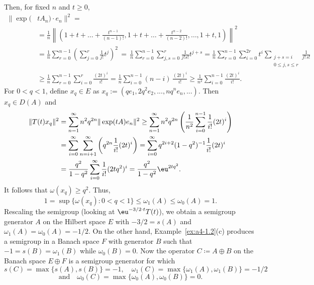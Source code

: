 \begin{example}
Then, for fixed $n$ and $t\ge 0$, 
\begin{align*}
	\|\exp(&t A_n) \cdot e_n\|^2 = \\
	&= \frac{1}{n} \left\| (1 + t + \dots + \frac{t^{n-1}}{(n-1)!}, 1 + t + \dots + \frac{t^{n-2}}{(n-2)!}, \dots, 1+t, 1) \right\|^2 \\
	&=
	\frac{1}{n} \sum_{r=0}^{n-1} \left(\sum_{j=0}^{r} \frac{1}{j!} t^j \right)^2 
	\, = \, \frac{1}{n} \sum_{r=0}^{n-1} \sum_{j,s=0}^{r} \frac{1}{j!s!} t^{j+s} 
	= \frac{1}{n} \sum_{r=0}^{n-1} \sum_{i=0}^{2r} t^i
	\sum_{\substack{j+s=i\\0\le j,s\le r}} \frac{1}{j!\,s!} \\
	&\ge \frac{1}{n} \sum_{r=0}^{n-1} \sum_{i=0}^{r} \frac{(2t)^i}{i!} 
	= \frac{1}{n} \sum_{i=0}^{n-1} (n-i)\,\frac{(2t)^i}{i!} 
	\ge \frac{1}{n^2} \sum_{i=0}^{n-1} \frac{(2t)^i}{i!}.
\end{align*}
For $ 0 < q < 1 $, define $ x_q \in E $ as  
$
x_q :=  (q e_1, 2q^2 e_2, ..., n q^n e_n, ...).
$
Then $x_q \in D(A)$ and
\begin{align*}
	\|T(t)x_q\|^2 & = \sum_{n=1}^{\infty} n^2 q^{2n} \| \exp(t A) e_n \|^2
	\geq \sum_{n=1}^{\infty} n^2 q^{2n} \left(\frac{1}{n^2} \sum_{i=0}^{n-1}  \frac{1}{i!} (2t)^i \right)\\
	&= \sum_{i=0}^{\infty} \sum_{n=i+1}^{\infty} \left( q^{2n} \frac{1}{i!} (2t)^i \right)
	= \sum_{i=0}^{\infty} q^{2i+2} (1 - q^2)^{-1} \frac{1}{i!} (2t)^i \\
	&= \frac{q^2}{1 - q^2} \sum_{i=0}^{\infty} \frac{1}{i!} (2t q^2)^i
	= \frac{q^2}{1 - q^2} \eu^{2t q^2}.
\end{align*}
It follows that $\omega(x_q) \geq q^2$. 
Thus,
\[
1 = \sup \{\omega(x_q)\colon0 < q < 1\} \leq \omega_1(A) \leq \omega_{0}(A) = 1.
\]
Rescaling the semigroup (\ie looking at $\eu^{-3/2 \cdot t} T(t)$), we obtain a semigroup generator $A$ on the Hilbert space $E$ with $-3/2 = s(A)$ and $\omega_1(A) = \omega_{0}(A) = -1/2$. 
On the other hand, Example~\ref{ex:a4-1.2}(c) produces a semigroup in a Banach space $F$ with generator $B$ such that $-1 = s(B) = \omega_1(B)$ while $\omega_{0}(B) = 0$. 
Now the operator $C \coloneq  A \oplus B$ on the Banach space $E \oplus F$ is a semigroup generator for which
\[
s(C) = \max \{s(A), s(B)\} = -1, \quad \omega_1(C) = \max\{\omega_1(A), \omega_1(B)\} = -1/2
\]
\[
\text{and} \quad \omega_{0}(C) = \max\{\omega_{0}(A), \omega_{0}(B)\} = 0.
\]
\end{example}
